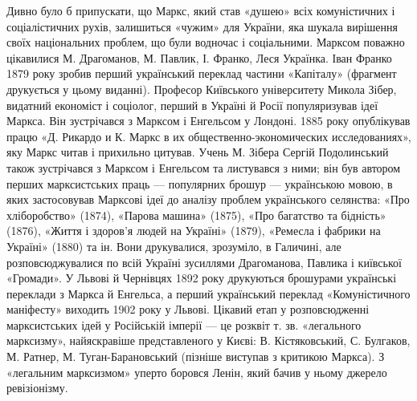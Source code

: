 Дивно було б припускати, що Маркс, який став «душею» всіх 
комуністичних і соціалістичних рухів, залишиться «чужим» для України, 
яка шукала вирішення своїх національних проблем, що були водночас і 
соціальними. Марксом поважно цікавилися М. Драгоманов, М. Павлик, І. 
Франко, Леся Українка. Іван Франко 1879 року зробив перший український 
переклад частини «Капіталу» (фрагмент друкується у цьому виданні). 
Професор Київського університету Микола Зібер, видатний економіст і 
соціолог, перший в Україні й Росії популяризував ідеї Маркса. Він 
зустрічався з Марксом і Енгельсом у Лондоні. 1885 року опублікував працю 
«Д. Рикардо и К. Маркс в их общественно-экономических исследованиях», 
яку Маркс читав і прихильно цитував. Учень М. Зібера Сергій 
Подолинський також зустрічався з Марксом і Енгельсом та листувався з 
ними; він був автором перших марксистських праць — популярних брошур 
— українською мовою, в яких застосовував Марксові ідеї до аналізу 
проблем українського селянства: «Про хліборобство» (1874), «Парова 
машина» (1875), «Про багатство та бідність» (1876), «Життя і здоров'я людей 
на Україні» (1879), «Ремесла і фабрики на Україні» (1880) та ін. Вони 
друкувалися, зрозуміло, в Галичині, але розповсюджувалися по всій 
Україні зусиллями Драгоманова, Павлика і київської «Громади». У 
Львові й Чернівцях 1892 року друкуються брошурами українські переклади 
з Маркса й Енгельса, а перший український переклад «Комуністичного 
маніфесту» виходить 1902 року у Львові. Цікавий етап у розповсюдженні 
марксистських ідей у Російській імперії — це розквіт т. зв. 
«легального марксизму», найяскравіше представленого у Києві: В. 
Кістяковський, С. Булгаков, М. Ратнер, М. Туган-Барановський (пізніше 
виступав з критикою Маркса). З «легальним марксизмом» уперто боровся 
Ленін, який бачив у ньому джерело ревізіонізму.


